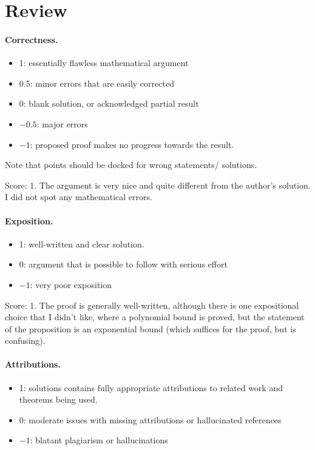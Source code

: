 \documentclass[11pt]{article}
\theoremstyle{remark}
\begin{document}
\maketitle

\section{Review}

\paragraph{Correctness.}
\begin{itemize}
	\item  1: essentially flawless mathematical argument
	\item  0.5: minor errors that are easily corrected
	\item  0: blank solution, or acknowledged partial result
	\item  $-0.5$: major errors
	\item  $-1$: proposed proof makes no progress towards the result.
\end{itemize}
Note that points should be docked for wrong statements/ solutions.

\noindent Score: 1.
The argument is very nice and quite different from the author's solution.
I did not spot any mathematical errors.

\paragraph{Exposition.}
\begin{itemize}
	\item  1: well-written and clear solution.
	\item  0: argument that is possible to follow with serious effort
	\item  $-1$: very poor exposition
\end{itemize}

\noindent Score: 1.
The proof is generally well-written, although there is one expositional choice that I didn't like, where a polynomial bound is proved, but the statement of the proposition is an exponential bound (which suffices for the proof, but is confusing).

\paragraph{Attributions.}
\begin{itemize}
	\item  1: solutions contains fully appropriate attributions
		to related work and theorems being used.
	\item  0: moderate issues with missing attributions or hallucinated references
	\item  $-1$: blatant plagiarism or hallucinations
\end{itemize}
\end{document}

